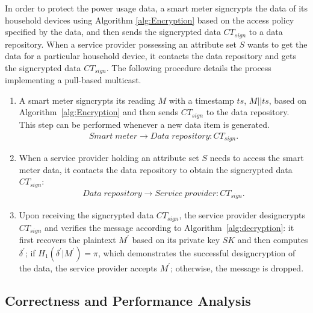 \documentclass[letterpaper,12pt]{article}
\begin{document}
In order to protect the power usage data, a smart meter signcrypts the data of its household devices using Algorithm \ref{alg:Encryption}  based on the access policy specified by the data, and then sends the signcrypted data $CT_{sign}$ to a data repository. When  a service provider  possessing an attribute set $S$ wants to get the data for a particular household device, it contacts the data repository and gets the signcrypted data $CT_{sign}$. The following procedure details the process implementing a pull-based multicast.
%
\begin{enumerate}
\item A smart meter signcrypts its reading $M$ with a timestamp $ts$, $M||ts$, based on Algorithm~\ref{alg:Encryption} and then sends $CT_{sign}$ to the data repository. This step can be performed whenever a new data item is generated.
\begin{equation}
\begin{split}
Smart\;  meter\rightarrow Data\; repository:
CT_{sign}.\nonumber
\end{split}
\end{equation}

\item When a service provider holding an attribute set $S$ needs to access the smart meter data, it contacts the data repository to obtain the signcrypted data $CT_{sign}$:
\begin{equation*}
\begin{split}
Data\; repository \rightarrow Service\; provider: CT_{sign}.\nonumber
\end{split}
\end{equation*}

\item Upon receiving the signcrypted data $CT_{sign}$, the service provider designcrypts $CT_{sign}$ and verifies the message according to Algorithm~\ref{alg:decryption}: it first recovers the plaintext $M^\prime$ based on its private key $SK$ and then computes $\delta^\prime$; if  $H_1(\delta^\prime|M^\prime) = \pi$, which demonstrates the successful designcryption of the data, the service provider accepts $M^\prime$; otherwise, the message is dropped.

\end{enumerate}

\subsection{Correctness and Performance Analysis}\label{sec:correctness_performance}
\end{document}
